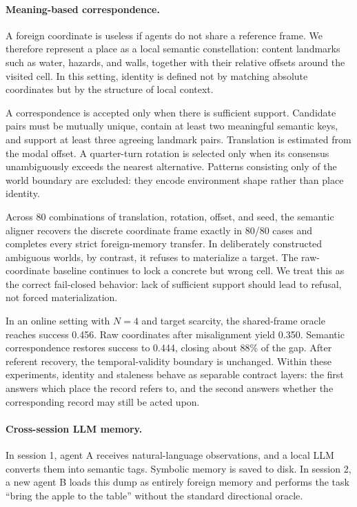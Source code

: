 \documentclass{article}
\begin{document}
\paragraph{Meaning-based correspondence.}
A foreign coordinate is useless if agents do not share a reference frame. We therefore represent a place as a local semantic constellation: content landmarks such as water, hazards, and walls, together with their relative offsets around the visited cell. In this setting, identity is defined not by matching absolute coordinates but by the structure of local context.

A correspondence is accepted only when there is sufficient support. Candidate pairs must be mutually unique, contain at least two meaningful semantic keys, and support at least three agreeing landmark pairs. Translation is estimated from the modal offset. A quarter-turn rotation is selected only when its consensus unambiguously exceeds the nearest alternative. Patterns consisting only of the world boundary are excluded: they encode environment shape rather than place identity.

Across 80 combinations of translation, rotation, offset, and seed, the semantic aligner recovers the discrete coordinate frame exactly in 80/80 cases and completes every strict foreign-memory transfer. In deliberately constructed ambiguous worlds, by contrast, it refuses to materialize a target. The raw-coordinate baseline continues to lock a concrete but wrong cell. We treat this as the correct fail-closed behavior: lack of sufficient support should lead to refusal, not forced materialization.

In an online setting with $N=4$ and target scarcity, the shared-frame oracle reaches success 0.456. Raw coordinates after misalignment yield 0.350. Semantic correspondence restores success to 0.444, closing about 88\% of the gap. After referent recovery, the temporal-validity boundary is unchanged. Within these experiments, identity and staleness behave as separable contract layers: the first answers which place the record refers to, and the second answers whether the corresponding record may still be acted upon.

\paragraph{Cross-session LLM memory.}
In session 1, agent A receives natural-language observations, and a local LLM converts them into semantic tags. Symbolic memory is saved to disk. In session 2, a new agent B loads this dump as entirely foreign memory and performs the task ``bring the apple to the table'' without the standard directional oracle.
\end{document}
